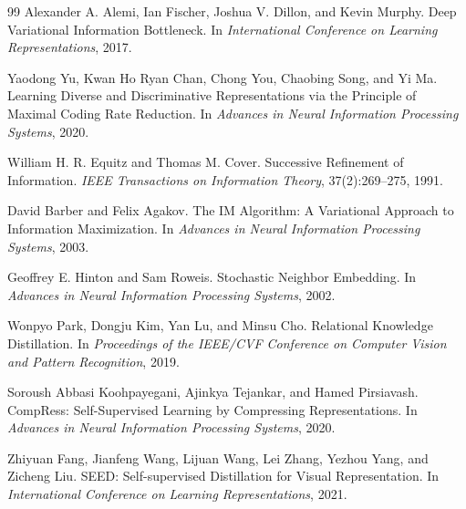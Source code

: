 \documentclass[11pt]{article}
\begin{document}
\begin{thebibliography}{99}
Alexander A. Alemi, Ian Fischer, Joshua V. Dillon, and Kevin Murphy.
\newblock Deep Variational Information Bottleneck.
\newblock In \emph{International Conference on Learning Representations},
2017.

Yaodong Yu, Kwan Ho Ryan Chan, Chong You, Chaobing Song, and Yi Ma.
\newblock Learning Diverse and Discriminative Representations via the
Principle of Maximal Coding Rate Reduction.
\newblock In \emph{Advances in Neural Information Processing Systems},
2020.

William H. R. Equitz and Thomas M. Cover.
\newblock Successive Refinement of Information.
\newblock \emph{IEEE Transactions on Information Theory},
37(2):269--275, 1991.

David Barber and Felix Agakov.
\newblock The IM Algorithm: A Variational Approach to Information Maximization.
\newblock In \emph{Advances in Neural Information Processing Systems}, 2003.

Geoffrey E. Hinton and Sam Roweis.
\newblock Stochastic Neighbor Embedding.
\newblock In \emph{Advances in Neural Information Processing Systems}, 2002.

Wonpyo Park, Dongju Kim, Yan Lu, and Minsu Cho.
\newblock Relational Knowledge Distillation.
\newblock In \emph{Proceedings of the IEEE/CVF Conference on Computer Vision and Pattern Recognition}, 2019.

Soroush Abbasi Koohpayegani, Ajinkya Tejankar, and Hamed Pirsiavash.
\newblock CompRess: Self-Supervised Learning by Compressing Representations.
\newblock In \emph{Advances in Neural Information Processing Systems}, 2020.

Zhiyuan Fang, Jianfeng Wang, Lijuan Wang, Lei Zhang, Yezhou Yang, and Zicheng Liu.
\newblock SEED: Self-supervised Distillation for Visual Representation.
\newblock In \emph{International Conference on Learning Representations}, 2021.

\end{thebibliography}
\end{document}
